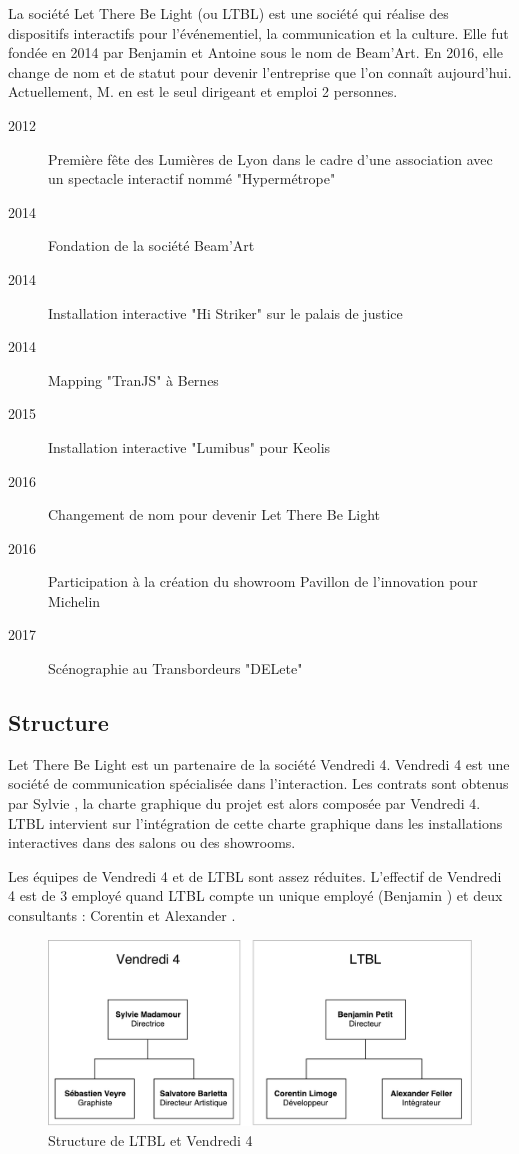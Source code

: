 La société Let There Be Light (ou LTBL) est une société qui réalise des dispositifs interactifs pour l'événementiel, la communication et la culture.
Elle fut fondée en 2014 par Benjamin  et Antoine  sous le nom de Beam'Art.
En 2016, elle change de nom et de statut pour devenir l'entreprise que l'on connaît aujourd'hui.
Actuellement, M.  en est le seul dirigeant et emploi 2 personnes.

\begin{description}
    \item[2012] Première fête des Lumières de Lyon dans le cadre d'une association avec un spectacle interactif nommé "Hypermétrope"
    \item[2014] Fondation de la société Beam'Art
    \item[2014] Installation interactive "Hi Striker" sur le palais de justice
    \item[2014] Mapping "TranJS" à Bernes
    \item[2015] Installation interactive "Lumibus" pour Keolis
    \item[2016] Changement de nom pour devenir Let There Be Light
    \item[2016] Participation à la création du showroom Pavillon de l'innovation pour Michelin
    \item[2017] Scénographie au Transbordeurs "DELete"
\end{description}

\subsection{Structure}

Let There Be Light est un partenaire de la société Vendredi 4.
Vendredi 4 est une société de communication spécialisée dans l'interaction.
Les contrats sont obtenus par Sylvie , la charte graphique du projet est alors composée par Vendredi 4.
LTBL intervient sur l'intégration de cette charte graphique dans les installations interactives dans des salons ou des showrooms.

Les équipes de Vendredi 4 et de LTBL sont assez réduites.
L'effectif de Vendredi 4 est de 3 employé quand LTBL compte un unique employé (Benjamin ) et deux consultants : Corentin  et Alexander .

\begin{figure}[h]
    \centering
    \includegraphics[scale=0.7]{img/Structure-LTBL.pdf}
    \caption{Structure de LTBL et Vendredi 4}
\end{figure}

